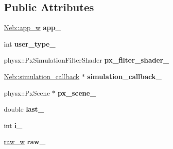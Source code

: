 \subsection*{\-Public \-Attributes}
\begin{DoxyCompactItemize}
\item 
\hypertarget{classNeb_1_1Scene_1_1scene_a421cb8d6ee72527217ad74970d908285}{\hyperlink{classNeb_1_1weak__ptr}{\-Neb\-::app\-\_\-w} {\bfseries app\-\_\-}}\label{classNeb_1_1Scene_1_1scene_a421cb8d6ee72527217ad74970d908285}

\item 
\hypertarget{classNeb_1_1Scene_1_1scene_a90f40046fcabc7d67abee7b26770d2fe}{int {\bfseries user\-\_\-type\-\_\-}}\label{classNeb_1_1Scene_1_1scene_a90f40046fcabc7d67abee7b26770d2fe}

\item 
\hypertarget{classNeb_1_1Scene_1_1scene_a2315422c05c4fb195690faa0a98e6e02}{physx\-::\-Px\-Simulation\-Filter\-Shader {\bfseries px\-\_\-filter\-\_\-shader\-\_\-}}\label{classNeb_1_1Scene_1_1scene_a2315422c05c4fb195690faa0a98e6e02}

\item 
\hypertarget{classNeb_1_1Scene_1_1scene_a5e8f5699ef4f9711e6a058e790905364}{\hyperlink{classNeb_1_1simulation__callback}{\-Neb\-::simulation\-\_\-callback} $\ast$ {\bfseries simulation\-\_\-callback\-\_\-}}\label{classNeb_1_1Scene_1_1scene_a5e8f5699ef4f9711e6a058e790905364}

\item 
\hypertarget{classNeb_1_1Scene_1_1scene_aeb51df1840080b6ca586fd9db32bf964}{physx\-::\-Px\-Scene $\ast$ {\bfseries px\-\_\-scene\-\_\-}}\label{classNeb_1_1Scene_1_1scene_aeb51df1840080b6ca586fd9db32bf964}

\item 
\hypertarget{classNeb_1_1Scene_1_1scene_a88687b6786e3a6dd37001801af6a730d}{double {\bfseries last\-\_\-}}\label{classNeb_1_1Scene_1_1scene_a88687b6786e3a6dd37001801af6a730d}

\item 
\hypertarget{classNeb_1_1Scene_1_1scene_ae9bdc3151e8268e6825d60054c094689}{int {\bfseries i\-\_\-}}\label{classNeb_1_1Scene_1_1scene_ae9bdc3151e8268e6825d60054c094689}

\item 
\hypertarget{classNeb_1_1Scene_1_1scene_a8aeb896ec31f4c570691b74a568b150d}{\hyperlink{classNeb_1_1weak__ptr}{raw\-\_\-w} {\bfseries raw\-\_\-}}\label{classNeb_1_1Scene_1_1scene_a8aeb896ec31f4c570691b74a568b150d}


\end{DoxyCompactItemize}
